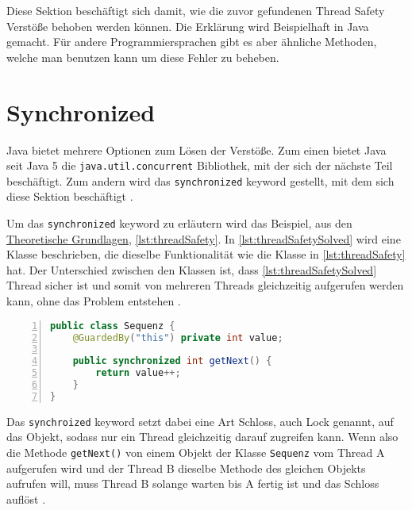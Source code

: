 \label{sec:loesen}

Diese Sektion beschäftigt sich damit, wie die zuvor gefundenen Thread Safety Verstöße behoben werden können. Die Erklärung wird Beispielhaft in Java gemacht. Für andere Programmiersprachen gibt es aber ähnliche Methoden, welche man benutzen kann um diese Fehler zu beheben.

\section{Synchronized}

 Java bietet mehrere Optionen zum Lösen der Verstöße. Zum einen bietet Java seit Java 5 die \texttt{java.util.concurrent} Bibliothek, mit der sich der nächste Teil beschäftigt. Zum andern wird das \texttt{synchronized} keyword gestellt, mit dem sich diese Sektion beschäftigt \cite[vgl.][121]{fekete_teaching_nodate}. 

 Um das \texttt{synchronized} keyword zu erläutern wird das Beispiel, aus den \hyperref[sec:threads]{Theoretische Grundlagen}, \ref{lst:threadSafety}. In \ref{lst:threadSafetySolved} wird eine Klasse beschrieben, die dieselbe Funktionalität wie die Klasse in \ref{lst:threadSafety} hat. Der Unterschied zwischen den Klassen ist, dass \ref{lst:threadSafetySolved} Thread sicher ist und somit von mehreren Threads gleichzeitig aufgerufen werden kann, ohne das Problem entstehen \cite[vgl.][5-6]{brian}. 
\\
 \begin{lstlisting}[language=Java,frame=tb,caption={Thread-safe Sequence Generator \cite{brian}}, label={lst:threadSafetySolved}, numbers=left, stepnumber=1, captionpos=b]
public class Sequenz {
	@GuardedBy("this") private int value;

	public synchronized int getNext() {
		return value++;
	}
}
\end{lstlisting}

Das \texttt{synchroized} keyword setzt dabei eine Art Schloss, auch Lock genannt, auf das Objekt, sodass nur ein Thread gleichzeitig darauf zugreifen kann. Wenn also die Methode \texttt{getNext()} von einem Objekt der Klasse \texttt{Sequenz} vom Thread A aufgerufen wird und der Thread B dieselbe Methode des gleichen Objekts aufrufen will, muss Thread B solange warten bis A fertig ist und das Schloss auflöst \cite[vgl.][17]{brian}.



